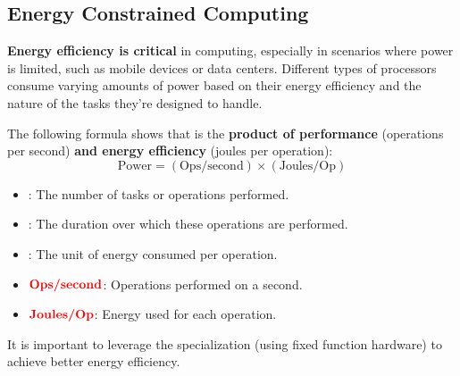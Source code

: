 \subsection{Energy Constrained Computing}

\textbf{Energy efficiency is critical} in computing, especially in scenarios where power is limited, such as mobile devices or data centers. Different types of processors consume varying amounts of power based on their energy efficiency and the nature of the tasks they're designed to handle.

\highspace
The following formula shows that  is the \textbf{product of performance} (operations per second) \textbf{and energy efficiency} (joules per operation):
\begin{equation}
    \text{Power} = \left( \text{Ops}/\text{second} \right) \times \left( \text{Joules}/\text{Op} \right)
\end{equation}
\begin{itemize}
    \item {}: The number of tasks or operations performed.
    \item {}: The duration over which these operations are performed.
    \item {}: The unit of energy consumed per operation.
    \item $\textcolor{red}{\textbf{\text{Ops}/\text{second}}}$: Operations performed on a second.
    \item $\textcolor{red}{\textbf{\text{Joules}/\text{Op}}}$: Energy used for each operation.
\end{itemize}
It is important to leverage the specialization (using fixed function hardware) to achieve better energy efficiency.

